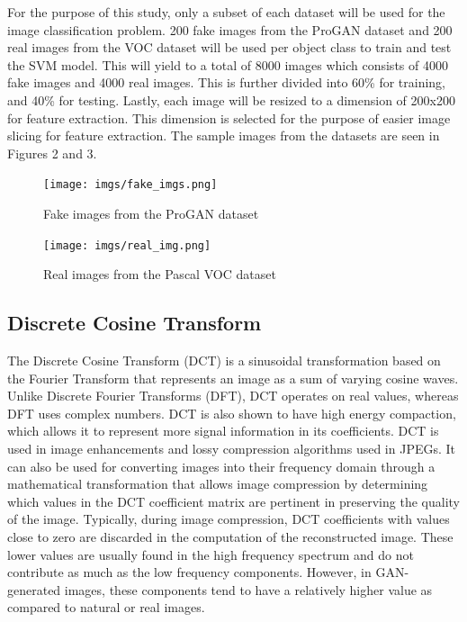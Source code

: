 \documentclass[journal]{./IEEE/IEEEtran}
\begin{document}
For the purpose of this study, only a subset of each dataset will be used for the image classification problem. 200 fake images from the ProGAN dataset and 200 real images from the VOC dataset will be used per object class to train and test the SVM model. This will yield to a total of 8000 images which consists of 4000 fake images and 4000 real images. This is further divided into 60\% for training, and 40\% for testing. Lastly, each image will be resized to a dimension of 200x200 for feature extraction. This dimension is selected for the purpose of easier image slicing for feature extraction. The sample images from the datasets are seen in Figures 2 and 3. 

\begin{figure}[!ht]
    \centering
    \texttt{[image: imgs/fake\_imgs.png]}
    \caption{Fake images from the ProGAN dataset}
    \label{fig:enter-label}
\end{figure}

\begin{figure}[!ht]
    \centering
    \texttt{[image: imgs/real\_img.png]}
    \caption{Real images from the Pascal VOC dataset}
    \label{fig:enter-label}
\end{figure}

\subsection{Discrete Cosine Transform}
The Discrete Cosine Transform (DCT) is a sinusoidal transformation based on the Fourier Transform that represents an image as a sum of varying cosine waves. Unlike Discrete Fourier Transforms (DFT), DCT operates on real values, whereas DFT uses complex numbers. DCT is also shown to have high energy compaction\cite{dct-energy-compaction}, which allows it to represent more signal information in its coefficients. DCT is used in image enhancements and lossy compression algorithms used in JPEGs. It can also be used for converting images into their frequency domain through a mathematical transformation that allows image compression by determining which values in the DCT coefficient matrix are pertinent in preserving the quality of the image. Typically, during image compression, DCT coefficients with values close to zero are discarded in the computation of the reconstructed image. These lower values are usually found in the high frequency spectrum and do not contribute as much as the low frequency components. However, in GAN-generated images, these components tend to have a relatively higher value as compared to natural or real images. 
\end{document}
